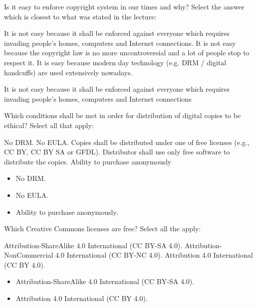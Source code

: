 \begin{question}[type=exam]
Is it easy to enforce copyright system in our times and why? Select the answer which is closest to what was stated in the lecture:
\begin{itemize}
\chk It is not easy because it shall be enforced against everyone which requires invading people's homes, computers and Internet connections.
\chk It is not easy because the copyright law is no more uncontroversial and a lot of people stop to respect it.
\chk It is easy because modern day technology (e.g. DRM / digital handcuffs) are used extensively nowadays.
\end{itemize}
\end{question}
\begin{solution}
It is not easy because it shall be enforced against everyone which requires invading people's homes, computers and Internet connections
\end{solution}


\begin{question}[type=exam]
Which conditions shall be met in order for distribution of digital copies to be ethical? Select all that apply:
\begin{itemize}
\chk No DRM.
\chk No EULA.
\chk Copies shall be distributed under one of free licenses (e.g., CC BY, CC BY SA or GFDL).
\chk Distributor shall use only free software to distribute the copies.
\chk Ability to purchase anonymously
\end{itemize}
\end{question}
\begin{solution}
\begin{itemize}
\item No DRM.
\item No EULA.
\item Ability to purchase anonymously.
\end{itemize}
\end{solution}


\begin{question}[type=exam]
Which Creative Commons licenses are free? Select all the apply:
\begin{itemize}
\chk Attribution-ShareAlike 4.0 International (CC BY-SA 4.0).
\chk Attribution-NonCommercial 4.0 International (CC BY-NC 4.0).
\chk Attribution 4.0 International (CC BY 4.0).
\end{itemize}
\end{question}
\begin{solution}
\begin{itemize}
\item Attribution-ShareAlike 4.0 International (CC BY-SA 4.0).
\item Attribution 4.0 International (CC BY 4.0).
\end{itemize}
\end{solution}


